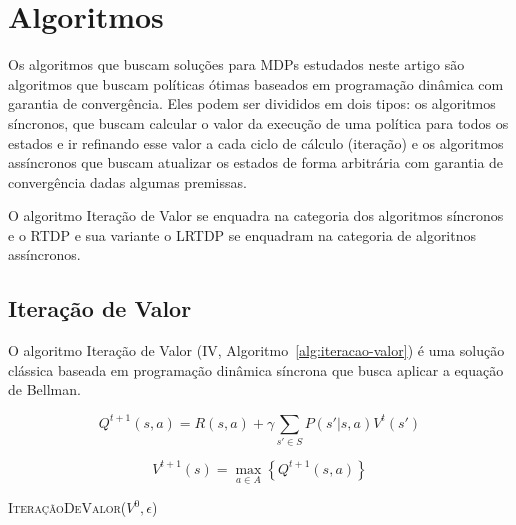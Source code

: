 \documentclass[letterpaper]{article}
\begin{document}
\section{Algoritmos}

Os algoritmos que buscam soluções para MDPs estudados neste artigo são algoritmos que buscam políticas ótimas baseados em programação dinâmica com garantia de convergência. Eles podem ser divididos em dois tipos: os algoritmos síncronos, que buscam calcular o valor da execução de uma política para todos os estados e ir refinando esse valor a cada ciclo de cálculo (iteração) e os algoritmos assíncronos que buscam atualizar os estados de forma arbitrária com garantia de convergência dadas algumas premissas.

O algoritmo Iteração de Valor \cite{Howard-1960} se enquadra na categoria dos algoritmos síncronos e o RTDP \cite{BartoBradtkeSingh-1995} e sua variante o LRTDP \cite{BonetGeffer-2003} se enquadram na categoria de algoritnos assíncronos.

\subsection{Iteração de Valor}

O algoritmo Iteração de Valor (IV, Algoritmo~\ref{alg:iteracao-valor}) é uma solução clássica baseada em programação dinâmica síncrona que busca aplicar a equação de Bellman.

\begin{equation}
    Q^{t+1}(s,a) = R(s,a) + \gamma \sum_{s' \in S} P(s'|s,a) V^{t}(s') \label{eq:qbackup}
\end{equation}

\begin{equation}
    V^{t+1}(s) = \max_{a \in A} \left\{ Q^{t+1}(s,a) \right\} \label{eq:vmax}
\end{equation}

\linesnumbered
\dontprintsemicolon
\begin{algorithm}[t!]
{
	\caption{\textsc{IteraçãoDeValor}($ V^0, \epsilon $)}
	\label{alg:iteracao-valor}
}
\end{algorithm}
\end{document}
